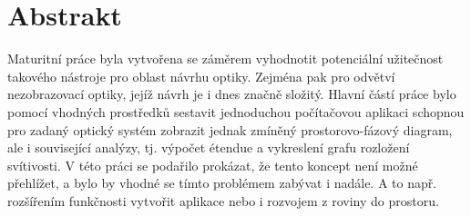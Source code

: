 \chapter*{Abstrakt}

Maturitní práce \textit{\thetitle} byla vytvořena se záměrem vyhodnotit potenciální užitečnost takového nástroje pro oblast návrhu optiky. Zejména pak pro odvětví nezobrazovací optiky, jejíž návrh je i dnes značně složitý. Hlavní částí práce bylo pomocí vhodných prostředků sestavit jednoduchou počítačovou aplikaci schopnou pro zadaný optický systém zobrazit jednak zmíněný prostorovo-fázový diagram, ale i související analýzy, tj. výpočet étendue a vykreslení grafu rozložení svítivosti. V této práci se podařilo prokázat, že tento koncept není možné přehlížet, a bylo by vhodné se tímto problémem zabývat i nadále. A to např. rozšířením funkčnosti vytvořit aplikace nebo i rozvojem z roviny do prostoru.
